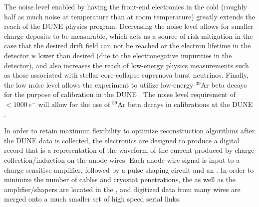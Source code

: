 The noise level enabled by having the front-end electronics in the cold (roughly half as much noise at \lar temperature than at room temperature) greatly extends the reach of the DUNE physics program.  Decreasing the noise level allows for smaller charge deposits to be measurable, which acts as a source of risk mitigation in the case that the desired drift field can not be reached or the electron lifetime in the detector is lower than desired (due to the electronegative impurities in the detector), and also increases the reach of low-energy physics measurements such as those associated with stellar core-collapse supernova burst neutrinos.  Finally, the low noise level allows the experiment to utilize low-energy $\mathrm{{}^{39}Ar}$ beta decays for the purpose of calibration in the DUNE .  The noise level requirement of \,$<\num{1000}\,e^-$ will allow for the use of $\mathrm{{}^{39}Ar}$ beta decays in calibrations at the DUNE .

In order to retain maximum flexibility to optimize reconstruction algorithms after the DUNE data is collected, the  electronics are designed to produce a digital record that is a representation of the waveform of the current produced by charge collection/induction on the anode wires.  Each anode wire signal is input to a charge sensitive amplifier, followed by a pulse shaping circuit and an .  In order to minimize the number of cables and cryostat penetrations, the  as well as the amplifier/shapers are located in the \lar, and digitized data from many wires are merged onto a much smaller set of high speed serial links.  %



